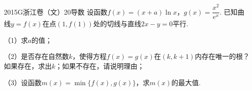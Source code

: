
\begin{problem}{2015}{G}{浙江卷（文）}{20}{导数}
设函数$f(x)=(x+a)\ln x$，$g(x)=\dfrac{x^2}{e^x}$. 已知曲线$y=f(x)$在点$(1,f(1))$处的切线与直线$2x-y=0$平行.

（1）求$a$的值；

（2）是否存在自然数$k$，使得方程$f(x)=g(x)$在$(k,k+1)$内存在唯一的根？如果存在，求出$k$；如果不存在，请说明理由；

（3）设函数$m(x)=\min\{f(x),g(x)\}$，求$m(x)$的最大值.
\end{problem}